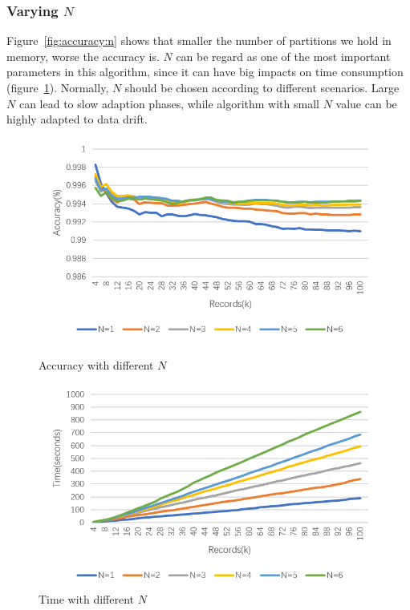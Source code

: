 \documentclass[runningheads]{llncs}
\begin{document}
	\subsubsection{Varying $N$}
	Figure~\ref{fig:accuracy:n} shows that smaller the number of partitions we hold in memory, worse the accuracy is. $N$ can be regard as one of the most important parameters in this algorithm, since it can have big impacts on time consumption (figure~\ref{fig:time:n}). Normally, $N$ should be chosen according to different scenarios. Large $N$ can lead to slow adaption phases, while algorithm with small $N$ value can be highly adapted to data drift.
	
	\begin{figure}
		\centering
		\begin{minipage}[t]{0.46\textwidth}
			\centering
			\includegraphics[width=1.0\textwidth]{figure-n-accuracy}
			\caption{Accuracy with different $N$}
			\label{fig:accuracy:n}
		\end{minipage}
		\hspace{3mm}
		\begin{minipage}[t]{0.46\textwidth}
			\centering
			\includegraphics[width=1.0\textwidth]{figure-n-time}
			\caption{Time with different $N$}
			\label{fig:time:n}
		\end{minipage}%
	\end{figure}
\end{document}
